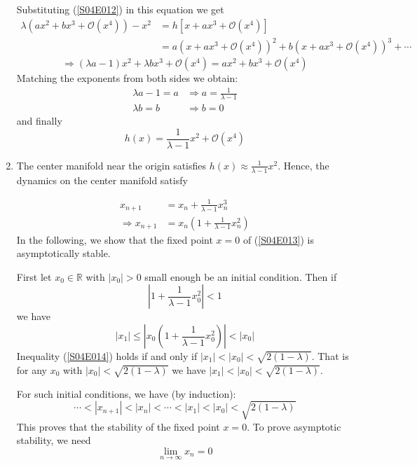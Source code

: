 \documentclass[twoside,10pt,a4paper]{article}
\begin{document}
\begin{enumerate}[label=(\alph*)]
Substituting (\ref{S04E012}) in this equation we get
\begin{align*}
	\lambda(ax^2 + bx^3 + \mathcal{O}(x^4)) - x^2 &= h[x + ax^3 + \mathcal{O}(x^4)] \\
	&= a(x + ax^3 + \mathcal{O}(x^4))^2 + b(x + ax^3 + \mathcal{O}(x^4))^3 + \cdots
\end{align*}
\begin{equation*}
	\Longrightarrow (\lambda a - 1)x^2 + \lambda b x^3 + \mathcal{O}(x^4) = ax^2 + bx^3 + \mathcal{O}(x^4)
\end{equation*}
Matching the exponents from both sides we obtain:
\begin{align*}
	\lambda a - 1 = a &\Longrightarrow a = \frac{1}{\lambda - 1} \\
	\lambda b = b &\Longrightarrow b = 0
\end{align*}
and finally
\begin{equation*}
	\boxed{
		h(x) = \frac{1}{\lambda - 1}x^2 + \mathcal{O}(x^4)	
	}
\end{equation*}


\item The center manifold near the origin satisfies $h(x) \approx \frac{1}{\lambda - 1}x^2$.
Hence, the dynamics on the center manifold satisfy

\begin{align}
	x_{n+1} &= x_n + \frac{1}{\lambda - 1}x_n^3 \nonumber \\
	\Longrightarrow x_{n+1} &= x_n \left( 1 + \frac{1}{\lambda - 1}x_n^2 \right) \label{S04E013}
\end{align}
In the following, we show that the fixed point $x=0$ of (\ref{S04E013}) is asymptotically stable. 

First let $x_0 \in \mathbb{R}$ with $|x_0|>0$ small enough be an initial condition. Then if
\begin{equation}\label{S04E014}
	\left\vert 1 + \frac{1}{\lambda - 1}x_0^2 \right\vert < 1
\end{equation}
we have
\begin{equation*}
	|x_1| \leq \left\vert x_0 \left( 1 + \frac{1}{\lambda - 1}x_0^2 \right) \right\vert < |x_0|
\end{equation*}
Inequality (\ref{S04E014}) holds if and only if $|x_1| < |x_0| < \sqrt{2(1-\lambda)}$. That is for any $x_0$ with $|x_0|<\sqrt{2(1-\lambda)}$ we have $|x_1| < |x_0| < \sqrt{2(1-\lambda)}$.

For such initial conditions, we have (by induction):
\begin{equation}\label{S04E015}
	\cdots < |x_{n+1}| < |x_n| < \cdots < |x_1| < |x_0| < \sqrt{2(1-\lambda)}
\end{equation}
This proves that the stability of the fixed point $x=0$. To prove asymptotic stability, we need
\begin{equation*}
	\lim_{n \rightarrow \infty} x_n = 0
\end{equation*}


\end{enumerate}
\end{document}
